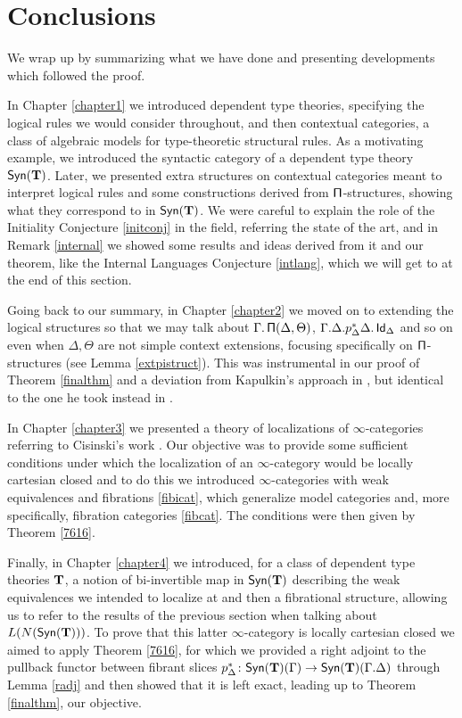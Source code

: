 \section{Conclusions}

We wrap up by summarizing what we have done and presenting developments which
followed the proof.

\noindent
In Chapter \ref{chapter1} we introduced dependent type theories, specifying the
logical rules we would consider throughout, and then contextual categories, a
class of algebraic models for type-theoretic structural rules. As a motivating
example, we introduced the syntactic category of a dependent type theory
$\mathsf{Syn}(\mathbf{T})$. Later, we presented extra structures on contextual categories meant
to interpret logical rules and some constructions derived from
$\operatorname{\mathsf{\Pi}}$-structures, showing what they correspond to in $\mathsf{Syn}(\mathbf{T})$. We were careful
to explain the role of the Initiality Conjecture \ref{initconj} in the field,
referring the state of the art, and
in Remark \ref{internal} we showed some results and ideas derived from it and our
theorem, like the Internal Languages Conjecture \ref{intlang}, which we will
get to at the end of this section.

\noindent
Going back to our summary, in Chapter \ref{chapter2} we moved on to extending
the logical structures so that we may talk about $\Gamma.\operatorname{\mathsf{\Pi}}(\Delta,\Theta)$,
$\Gamma.\Delta.p^*_\Delta\Delta.\operatorname{\mathsf{Id}}_\Delta$ and so on even when $\Delta,\Theta$
are not simple context extensions, focusing specifically on $\operatorname{\mathsf{\Pi}}$-structures
(see Lemma \ref{extpistruct}). This was instrumental in our proof of Theorem
\ref{finalthm} and a deviation from Kapulkin's approach in \cite{Kap14}, but
identical to the one he took instead in \cite{Kap17}.

\noindent
In Chapter \ref{chapter3} we presented a theory of localizations of
$\infty$-categories referring to Cisinski's work \cite{Cis19}. Our objective was
to provide some sufficient conditions under which the localization of an
$\infty$-category would be locally cartesian closed and to do this we introduced
$\infty$-categories with weak equivalences and fibrations \ref{fibicat}, which
generalize model categories and, more specifically, fibration categories
\ref{fibcat}. The conditions were then given by Theorem \ref{7616}.

\noindent
Finally, in Chapter \ref{chapter4} we introduced, for a class of dependent type
theories $\operatorname{\mathbf{T}}$, a notion of bi-invertible map in $\mathsf{Syn}(\mathbf{T})$ describing the weak
equivalences we intended to localize at and then a fibrational structure,
allowing us to refer to the results of the previous section when talking about
$L(N(\mathsf{Syn}(\mathbf{T})))$. To prove that this latter $\infty$-category is locally
cartesian closed we aimed to apply Theorem \ref{7616}, for which
we provided a right adjoint to the pullback functor between fibrant
slices $p^*_\Delta\colon\mathsf{Syn}(\mathbf{T})(\Gamma)\rightarrow\mathsf{Syn}(\mathbf{T})(\Gamma.\Delta)$
through Lemma \ref{radj} and then showed that it is left exact, leading up to
Theorem \ref{finalthm}, our objective.

